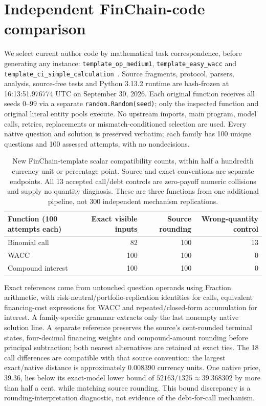 \section{Independent FinChain-code comparison}\label{app:independent-finchain}
We select current author code by mathematical task correspondence, before generating any instance: \texttt{template\_op\_medium1}, \texttt{template\_easy\_wacc} and \texttt{template\_ci\_simple\_calculation}~\cite{finchaincode}. Source fragments, protocol, parsers, analysis, source-free tests and Python 3.13.2 runtime are hash-frozen at 16:13:51.976774 UTC on September 30, 2026. Each original function receives all seeds 0--99 via a separate \texttt{random.Random(seed)}; only the inspected function and original literal entity pools execute. No upstream imports, main program, model calls, retries, replacements or mismatch-conditioned selection are used. Every native question and solution is preserved verbatim; each family has 100 unique questions and 100 assessed attempts, with no nondecisions.

\begin{table}[!ht]
\centering\small
\begin{tabular}{lrrr}
\toprule
Function (100 attempts each) & Exact visible inputs & Source rounding & Wrong-quantity control\\
\midrule
Binomial call & 82 & 100 & 13\\
WACC & 100 & 100 & 0\\
Compound interest & 100 & 100 & 0\\
\bottomrule
\end{tabular}
\caption{New FinChain-template scalar compatibility counts, within half a hundredth currency unit or percentage point. Source and exact conventions are separate endpoints. All 13 accepted call/debt controls are zero-payoff numeric collisions and supply no quantity diagnosis. These are three functions from one additional pipeline, not 300 independent mechanism replications.}
\label{tab:independent-finchain}
\end{table}

Exact references come from untouched question operands using Fraction arithmetic, with risk-neutral/portfolio-replication identities for calls, equivalent financing-cost expressions for WACC and repeated/closed-form accumulation for interest. A family-specific grammar extracts only the last nonempty native solution line. A separate reference preserves the source's cent-rounded terminal states, four-decimal financing weights and compound-amount rounding before principal subtraction; both nearest alternatives are retained at exact ties. The 18 call differences are compatible with that source convention; the largest exact/native distance is approximately 0.008390 currency units. One native price, 39.36, lies below its exact-model lower bound of $52163/1325\approx39.368302$ by more than half a cent, while matching source rounding. This bound discrepancy is a rounding-interpretation diagnostic, not evidence of the debt-for-call mechanism.

